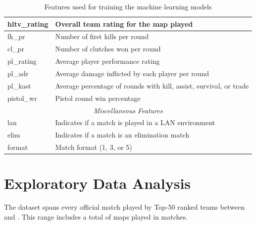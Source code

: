 \begin{table}[h]
\begin{tabular}{|l|l|}
		hltv\_rating          & Overall team rating for the map played                                 \\ \hline
		fk\_pr 			      & Number of first kills per round                                        \\ \hline
		cl\_pr    			  & Number of clutches won per round                                       \\ \hline
		pl\_rating            & Average player performance rating                                      \\ \hline
		pl\_adr               & Average damage inflicted by each player per round                      \\ \hline
		pl\_kast              & Average percentage of rounds with kill, assist, survival, or trade     \\ \hline
		pistol\_wr 		      & Pistol round win percentage                                            \\ \hline
	\multicolumn{2}{|c|}{\rule{0pt}{2.6ex}\textit{Miscellaneous Features}} \\ \hline
		lan                   & Indicates if a match is played in a LAN environment                    \\ \hline
		elim                  & Indicates if a match is an elimination match                           \\ \hline
		format                & Match format (1, 3, or 5)                                              \\ \hline
	\end{tabular}
	\caption{Features used for training the machine learning models}
	\label{tab:features}
\end{table}

\clearpage

\section{Exploratory Data Analysis}

The dataset spans every official match played by Top-50 ranked teams between \datasetStartDate{} and \datasetEndDate{}. This range includes a total of \mapsTotal{} maps played in \matchesTotal{} matches.




